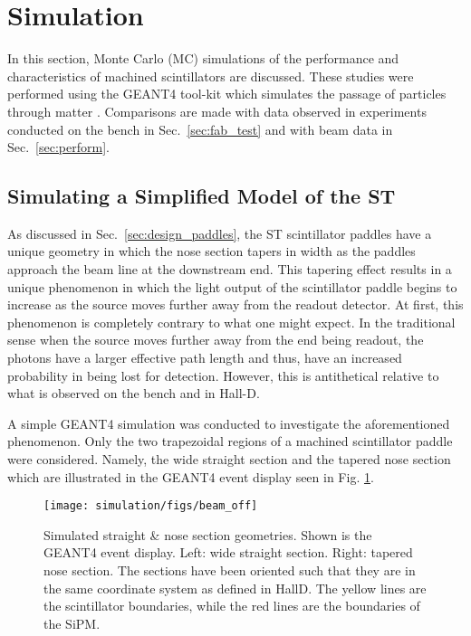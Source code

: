 \section{Simulation} \label{sec:sim}

In this section,  Monte Carlo (MC) simulations of the performance and characteristics of machined scintillators  are discussed.  These  studies were performed using the GEANT4 tool-kit which simulates the passage of particles through matter \cite{geant4_website}.  Comparisons are made with data observed in experiments conducted on the bench in Sec.~\ref{sec:fab_test} and with beam data in Sec.~\ref{sec:perform}.  

%
%

\subsection{Simulating a Simplified Model of the ST} \label{sec:sim_simple}

As discussed in Sec.~\ref{sec:design_paddles}, the ST scintillator paddles have a unique geometry in which the nose section tapers in width as the paddles approach the beam line at the downstream end.  This tapering effect results in a unique phenomenon in which the light output of the scintillator paddle begins to increase as the source moves further away from the readout detector.  At first, this phenomenon is completely contrary to what one might expect. In the traditional sense when the source moves further away from the end being readout, the photons have a larger effective path length and thus, have an increased probability in being lost for detection.  However, this is antithetical relative to what is observed on the bench and in Hall-D.

A simple GEANT4 simulation was conducted to investigate the aforementioned phenomenon. Only the two trapezoidal regions of a machined scintillator paddle were considered.  Namely, the wide straight section and the tapered nose section which are illustrated in the GEANT4 event display  seen in Fig. \ref{fig:beam_off}.
	\begin{figure}[!htb]
	\centering
	\texttt{[image: simulation/figs/beam\_off]}
	\caption{Simulated straight \& nose section geometries.  Shown is the GEANT4 event display.  Left: wide straight section.  Right: tapered nose section.  The sections have been oriented such that they are in the same coordinate system as defined in HallD.  The yellow lines are the scintillator boundaries, while the red lines are the boundaries of the SiPM.}
	\label{fig:beam_off}
	\end{figure}  


